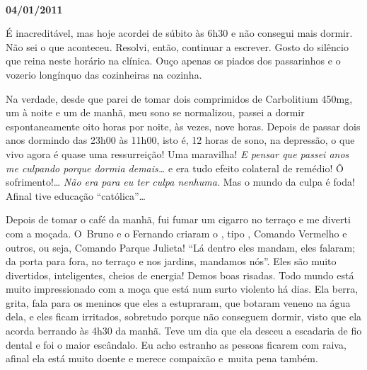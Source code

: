 \begin{center}\asterisc{}​\end{center}


\begin{flushright}\textbf{04/01/2011}\end{flushright}


É inacreditável, mas hoje acordei de súbito às 6h30 e não consegui mais
dormir. Não sei o que aconteceu. Resolvi, então, continuar a escrever.
Gosto do silêncio que reina neste horário na clínica. Ouço apenas os
piados dos passarinhos e o vozerio longínquo das cozinheiras na cozinha.

Na verdade, desde que parei de tomar dois comprimidos de Carbolitium 
450mg, um à noite e um de manhã, meu sono se normalizou, passei a dormir
espontaneamente oito horas por noite, às vezes, nove horas. Depois de
passar dois anos dormindo das 23h00 às 11h00, isto é, 12 horas de sono,
na depressão, o que vivo agora é quase uma ressurreição! Uma maravilha!
\emph{E pensar que passei anos me culpando porque dormia demais…}
e era tudo efeito colateral de remédio! Ô sofrimento!… \emph{Não
era para eu ter culpa nenhuma.} Mas o mundo da culpa é foda! Afinal tive
educação ``católica''…

Depois de tomar o café da manhã, fui fumar um cigarro no terraço e me
diverti com a moçada. O~Bruno e o Fernando criaram o , tipo ,
Comando Vermelho e outros, ou seja, Comando Parque Julieta! ``Lá dentro
eles mandam, eles falaram; da porta para fora, no terraço e nos jardins,
mandamos nós''. Eles são muito divertidos, inteligentes, cheios de
energia! Demos boas risadas. Todo mundo está muito impressionado com a
moça que está num surto violento há dias. Ela berra, grita, fala para os
meninos que eles a estupraram, que botaram veneno na água dela, e eles
ficam irritados, sobretudo porque não conseguem dormir, visto que ela
acorda berrando às 4h30 da manhã. Teve um dia que ela desceu a escadaria
de fio dental e foi o maior escândalo. Eu acho estranho as pessoas
ficarem com raiva, afinal ela está muito doente e merece compaixão e~muita pena também.

